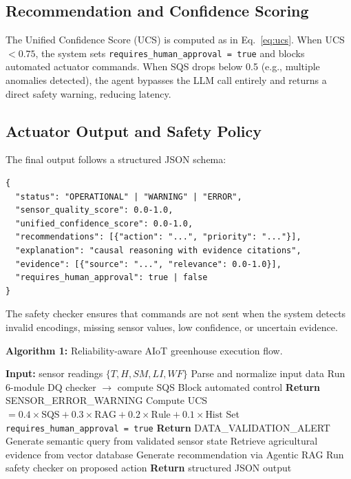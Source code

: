 \documentclass[runningheads]{llncs}
\begin{document}
\subsection{Recommendation and Confidence Scoring}
The Unified Confidence Score (UCS) is computed as in Eq.~\ref{eq:ucs}. When UCS $< 0.75$, the system sets \texttt{requires\_human\_approval = true} and blocks automated actuator commands. When SQS drops below 0.5 (e.g., multiple anomalies detected), the agent bypasses the LLM call entirely and returns a direct safety warning, reducing latency.

\subsection{Actuator Output and Safety Policy}
The final output follows a structured JSON schema:
\begin{verbatim}
{
  "status": "OPERATIONAL" | "WARNING" | "ERROR",
  "sensor_quality_score": 0.0-1.0,
  "unified_confidence_score": 0.0-1.0,
  "recommendations": [{"action": "...", "priority": "..."}],
  "explanation": "causal reasoning with evidence citations",
  "evidence": [{"source": "...", "relevance": 0.0-1.0}],
  "requires_human_approval": true | false
}
\end{verbatim}
The safety checker ensures that commands are not sent when the system detects invalid encodings, missing sensor values, low confidence, or uncertain evidence.

\vspace{0.2cm}
\noindent\textbf{Algorithm 1:} Reliability-aware AIoT greenhouse execution flow.
\begin{algorithm}[htbp]
\begin{algorithmic}[1]
\STATE \textbf{Input:} sensor readings $\{T, H, SM, LI, WF\}$
\STATE Parse and normalize input data
\STATE Run 6-module DQ checker $\rightarrow$ compute SQS
    \STATE Block automated control
    \STATE \textbf{Return} SENSOR\_ERROR\_WARNING
\ENDIF
\STATE Compute UCS $= 0.4 \times \text{SQS} + 0.3 \times \text{RAG} + 0.2 \times \text{Rule} + 0.1 \times \text{Hist}$
    \STATE Set \texttt{requires\_human\_approval = true}
    \STATE \textbf{Return} DATA\_VALIDATION\_ALERT
\ENDIF
\STATE Generate semantic query from validated sensor state
\STATE Retrieve agricultural evidence from vector database
\STATE Generate recommendation via Agentic RAG
\STATE Run safety checker on proposed action
\STATE \textbf{Return} structured JSON output
\end{algorithmic}
\end{algorithm}
\end{document}
